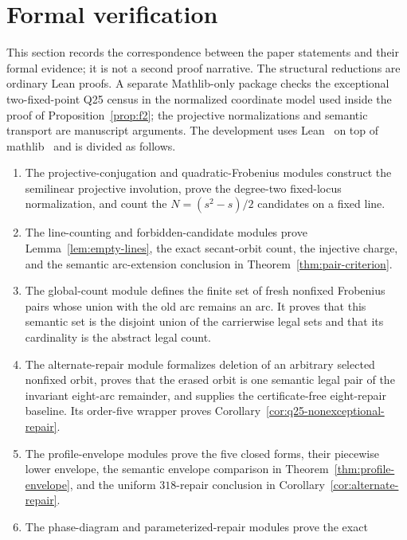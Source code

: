 \documentclass[11pt]{article}
\theoremstyle{definition}
\theoremstyle{remark}
\begin{document}
\section{Formal verification}\label{sec:formalization}

This section records the correspondence between the paper statements and
their formal evidence; it is not a second proof narrative.  The structural
reductions are ordinary Lean proofs.  A separate Mathlib-only package checks
the exceptional two-fixed-point Q25 census in the normalized coordinate model
used inside the proof of Proposition~\ref{prop:f2}; the projective
normalizations and semantic transport are manuscript arguments.  The development uses
Lean~\cite{Lean2015} on top of mathlib~\cite{Mathlib2020} and is divided as
follows.

\begin{enumerate}[leftmargin=2.2em]
\item The projective-conjugation and quadratic-Frobenius modules construct
      the semilinear projective involution, prove the degree-two fixed-locus
      normalization, and count the $N=(s^2-s)/2$ candidates on a fixed line.
\item The line-counting and forbidden-candidate modules prove
      Lemma~\ref{lem:empty-lines}, the exact secant-orbit count, the
      injective charge, and the semantic arc-extension conclusion in
      Theorem~\ref{thm:pair-criterion}.
\item The global-count module defines the finite set of fresh nonfixed
      Frobenius pairs whose union with the old arc remains an arc.  It proves
      that this semantic set is the disjoint union of the carrierwise legal
      sets and that its cardinality is the abstract legal count.
\item The alternate-repair module formalizes deletion of an arbitrary
      selected nonfixed orbit, proves that the erased orbit is one semantic
      legal pair of the invariant eight-arc remainder, and supplies the
      certificate-free eight-repair baseline.  Its order-five wrapper proves
      Corollary~\ref{cor:q25-nonexceptional-repair}.
\item The profile-envelope modules prove the five closed forms, their
      piecewise lower envelope, the semantic envelope comparison in
      Theorem~\ref{thm:profile-envelope}, and the uniform $318$-repair
      conclusion in Corollary~\ref{cor:alternate-repair}.
\item The phase-diagram and parameterized-repair modules prove the exact

\end{enumerate}
\end{document}
